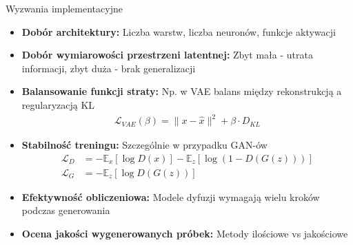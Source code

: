 \documentclass{beamer}
\begin{document}
\begin{frame}{Wyzwania implementacyjne}
    \begin{itemize}
        \item \textbf{Dobór architektury:} Liczba warstw, liczba neuronów, funkcje aktywacji
        \item \textbf{Dobór wymiarowości przestrzeni latentnej:} Zbyt mała - utrata informacji, zbyt duża - brak generalizacji
        \item \textbf{Balansowanie funkcji straty:} Np. w VAE balans między rekonstrukcją a regularyzacją KL
              \begin{align*}
                  \mathcal{L}_{VAE}(\beta) = \|x - \hat{x}\|^2 + \beta \cdot D_{KL}
              \end{align*}
        \item \textbf{Stabilność treningu:} Szczególnie w przypadku GAN-ów
              \begin{align*}
                  \mathcal{L}_D & = -\mathbb{E}_x[\log D(x)] - \mathbb{E}_z[\log(1 - D(G(z)))] \\
                  \mathcal{L}_G & = -\mathbb{E}_z[\log D(G(z))]
              \end{align*}
        \item \textbf{Efektywność obliczeniowa:} Modele dyfuzji wymagają wielu kroków podczas generowania
        \item \textbf{Ocena jakości wygenerowanych próbek:} Metody ilościowe vs jakościowe
    \end{itemize}
\end{frame}
\end{document}
